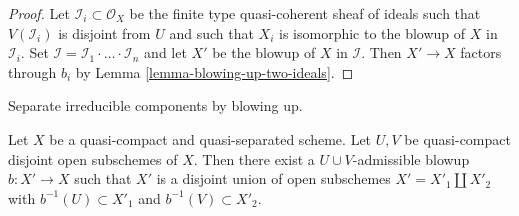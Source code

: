 \begin{proof}
Let $\mathcal{I}_i \subset \mathcal{O}_X$ be the finite type
quasi-coherent sheaf of ideals such that $V(\mathcal{I}_i)$ is
disjoint from $U$ and such that $X_i$ is isomorphic to the
blowup of $X$ in $\mathcal{I}_i$. Set
$\mathcal{I} = \mathcal{I}_1 \cdot \ldots \cdot \mathcal{I}_n$
and let $X'$ be the blowup of $X$ in $\mathcal{I}$. Then
$X' \to X$ factors through $b_i$ by Lemma \ref{lemma-blowing-up-two-ideals}.
\end{proof}

\begin{lemma}
\label{lemma-separate-disjoint-opens-by-blowing-up}
\begin{slogan}
Separate irreducible components by blowing up.
\end{slogan}
Let $X$ be a quasi-compact and quasi-separated scheme.
Let $U, V$ be quasi-compact disjoint open subschemes of $X$.
Then there exist a $U \cup V$-admissible blowup $b : X' \to X$
such that $X'$ is a disjoint union of open subschemes
$X' = X'_1 \amalg X'_2$ with $b^{-1}(U) \subset X'_1$ and
$b^{-1}(V) \subset X'_2$.
\end{lemma}

